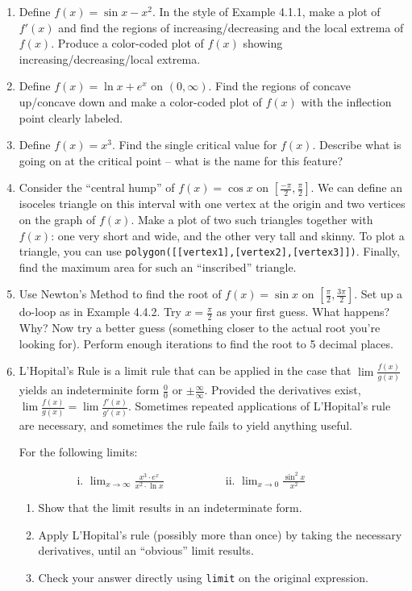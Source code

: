 \documentclass[10.5pt,twoside]{report}
\theoremstyle{definition}
\begin{document}
\begin{enumerate}

\item
Define $f(x)=\sin{x}-x^2$.  In the style of Example 4.1.1, make a plot of $f'(x)$ and find the regions of  increasing/decreasing and the local extrema of $f(x)$.  Produce a color-coded plot of $f(x)$ showing increasing/decreasing/local extrema. 
\item
Define $f(x)=\ln{x}+e^x$ on $(0,\infty)$.  Find the regions of concave up/concave down and make a color-coded plot of $f(x)$ with the inflection point clearly labeled.
\item
Define $f(x)=x^3$.  Find the single critical value for $f(x)$.  Describe what is going on at the critical point -- what is the name for this feature?
\item
Consider the ``central hump'' of $f(x)=\cos{x}$ on $[\frac{-\pi}{2},\frac{\pi}{2}]$.  We can define an isoceles triangle on this interval with one vertex at the origin and two vertices on the graph of $f(x)$.  Make a plot of two such triangles together with $f(x)$:  one very short and wide, and the other very tall and skinny.  To plot a triangle, you can use \verb|polygon([[vertex1],[vertex2],[vertex3]])|.  Finally, find the maximum area for such an ``inscribed'' triangle.
\item
Use Newton's Method to find the root of $f(x)=\sin{x}$ on $[\frac{\pi}{2},\frac{3\pi}{2}]$.  Set up a do-loop as in Example 4.4.2.  Try $x=\frac{\pi}{2}$ as your first guess.  What happens?  Why?  Now try a better guess (something closer to the actual root you're looking for).  Perform enough iterations to find the root to 5 decimal places.
\item
L'Hopital's Rule is a limit rule that can be applied in the case that $\lim \frac{f(x)}{g(x)}$ yields an indeterminite form $\frac {0}{0}$ or $\pm \frac{\infty}{\infty}$.  Provided the derivatives exist, $\lim \frac{f(x)}{g(x)} = \lim \frac{f'(x)}{g'(x)}$.  Sometimes repeated applications of L'Hopital's rule are necessary, and sometimes the rule fails to yield anything useful.

For the following limits:

 \verb|          |i. $\lim_{x \to \infty} \frac{x^3 \cdot e^x}{x^2 \cdot \ln{x}} $
 \verb|          |ii.  $\lim_{x \to 0} \frac {\sin^2{x}}{x^2}$

 \begin{enumerate}
  \item Show that the limit results in an indeterminate form.
  \item Apply L'Hopital's rule (possibly more than once) by taking the necessary derivatives, until an ``obvious'' limit results.
  \item Check your answer directly using \verb|limit| on the original expression.
 \end{enumerate}
 


\end{enumerate}
\end{document}
